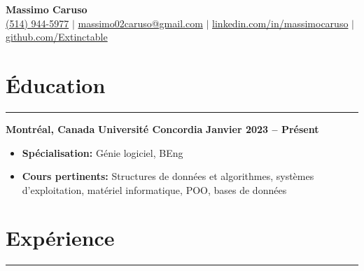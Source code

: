 \documentclass[10pt]{article}
\begin{document}
\newcommand{\fullname}{Massimo Caruso}
\newcommand{\phone}{(514) 944-5977}
\newcommand{\email}{massimo02caruso@gmail.com}
\newcommand{\linkedin}{linkedin.com/in/massimocaruso}
\newcommand{\github}{github.com/Extinctable}

\begin{center}
    {\Huge \textbf{\fullname}} \\
    \vspace{1mm}
    {\small 
    \faPhone \hspace{0mm} \href{tel:+15149445977}{\phone} $\vert$ 
    \faEnvelope \hspace{0mm} \href{mailto:massimo02caruso@gmail.com}{\email} $\vert$ 
    \faLinkedin \hspace{0mm} \href{https://linkedin.com/in/massimocaruso}{\linkedin} $\vert$ 
    \faGithub \hspace{0mm} \href{https://github.com/Extinctable}{\github}
    }
\end{center}

\vspace{-8mm}

\section*{Éducation}
\vspace{-2mm}
\hrule
\vspace{0mm}

\textbf{Montréal, Canada} \hfill \textbf{Université Concordia} \hfill \textbf{Janvier 2023 -- Présent} 
\vspace{-4mm}
\begin{itemize}[left=0.15in, itemsep=0pt]
    \item \textbf{Spécialisation:} Génie logiciel, BEng
    \item \textbf{Cours pertinents:} Structures de données et algorithmes, systèmes d'exploitation, matériel informatique, POO, bases de données
\end{itemize}

\section*{Expérience}
\vspace{-2mm}
\hrule
\vspace{0mm}
\end{document}
